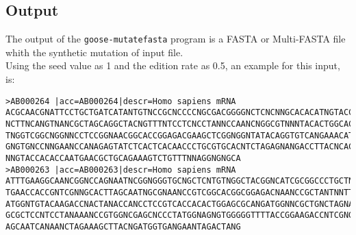 \subsection*{Output}
The output of the \texttt{goose-mutatefasta} program is a FASTA or Multi-FASTA file whith the synthetic mutation of input file.\\
Using the seed value as 1 and the edition rate as 0.5, an example for this input, is: 
\begin{lstlisting}
>AB000264 |acc=AB000264|descr=Homo sapiens mRNA 
ACGCAACGNATTCCTGCTGATCATANTGTNCCGCNCCCCNGCGACGGGGNCTCNCNNGCACACATNGTACCATTGTCCAC
NCTTNCANGTNANCGCTAGCAGGCTACNGTTTNTCCTCNCCTANNCCAANCNGGCGTNNNTACACTGGCACGTGCAGGCA
TNGGTCGGCNGGNNCCTCCGGNAACGGCACCGGAGACGAAGCTCGGNGGNTATACAGGTGTCANGAAACATCCCCGCGNC
GNGTGNCCNNGAANCCANAGAGTATCTCACTCACAACCCTGCGTGCACNTCTAGAGNANGACCTTACNCACCNTCCCNTT
NNGTACCACACCAATGAACGCTGCAGAAAGTCTGTTTNNAGGNGNGCA
>AB000263 |acc=AB000263|descr=Homo sapiens mRNA 
ATTTGAAGGCAANCGGNCCAGNAATNCGGNGGGTGCNGCTCNTGTNGGCTACGGNCATCGCGGCCCTGCTNTANTAAGCN
TGAACCACCGNTCGNNGCACTTAGCAATNGCGNAANCCGTCGGCACGGCGGAGACNAANCCGCTANTNNTTTCCCGCTNA
ATGGNTGTACAAGACCNACTANACCANCCTCCGTCACCACACTGGAGCGCANGATGGNNCGCTGNCTAGNAGNCNNTGAG
GCGCTCCNTCCTANAAANCCGTGGNCGAGCNCCCTATGGNAGNGTGGGGGTTTTACCGGAAGACCNTCGNGCCCTATGGG
AGCAATCANAANCTAGAAAGCTTACNGATGGTGANGAANTAGACTANG
\end{lstlisting}
